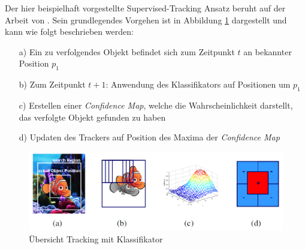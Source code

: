 Der hier beispielhaft vorgestellte Supervised-Tracking Ansatz beruht auf der Arbeit von \cite[]{Grabner}.
Sein grundlegendes Vorgehen ist in Abbildung \ref{fig:grund_tracking} dargestellt und kann wie folgt
beschrieben werden:

\begin{itemize}
    \item[a)] Ein zu verfolgendes Objekt befindet sich zum Zeitpunkt $t$ an bekannter Position $p_1$
    \item[b)] Zum Zeitpunkt $t+1$: Anwendung des Klassifikators auf Positionen um $p_1$
    \item[c)] Erstellen einer \textit{Confidence Map}, welche die Wahrscheinlichkeit darstellt,
                das verfolgte Objekt gefunden zu haben
    \item[d)] Updaten des Trackers auf Position des Maxima der \textit{Confidence Map}
\end{itemize}

\begin{figure}[H]
    \centering
    \includegraphics[width=0.7\linewidth]{resources/img/grundlagen/TrajectoryReconstruction/tracking}
    \caption[Übersicht Tracking mit Klassifikator]{Übersicht Tracking mit Klassifikator \cite[]{Grabner}}
    \label{fig:grund_tracking}
\end{figure}


